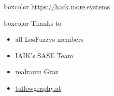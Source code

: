 {
\begin{frame}[plain]

  \begin{center}
  	\begin{beamercolorbox}[sep=0.5em,wd=10cm]{boxcolor}
	    \color{white}
	    {\huge \url{https://hack.more.systems}}
	\end{beamercolorbox}
  \end{center}

  \vspace{3em}


  \begin{beamercolorbox}[sep=1em,wd=5cm]{boxcolor}
    Thanks to

    \begin{itemize}
      \item all LosFuzzys members
      \item IAIK's SASE Team
      \item realraum Graz
      \item \url{tuflowgraphy.at}
    \end{itemize}


  \end{beamercolorbox}

\end{frame}
}

